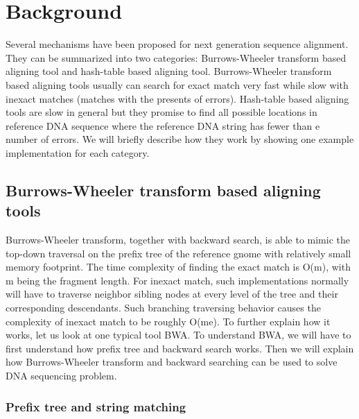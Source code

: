 \section{Background} \label{sec:background} 

Several mechanisms have been proposed for next generation sequence alignment.
They can be summarized into two categories: Burrows-Wheeler transform based
aligning tool and hash-table based aligning tool. Burrows-Wheeler transform
based aligning tools usually can search for exact match very fast while slow
with inexact matches (matches with the presents of errors). Hash-table based
aligning tools are slow in general but they promise to find all possible
locations in reference DNA sequence where the reference DNA string has fewer
than e number of errors. We will briefly describe how they work by showing one
example implementation for each category. \\

\subsection{Burrows-Wheeler transform based aligning tools} 

Burrows-Wheeler transform, together with backward search, is able to mimic the
top-down traversal on the prefix tree of the reference gnome with relatively
small memory footprint. The time complexity of finding the exact match is O(m),
with m being the fragment length. For inexact match, such implementations
normally will have to traverse neighbor sibling nodes at every level of the
tree and their corresponding descendants. Such branching traversing behavior
causes the complexity of inexact match to be roughly O(me). To further explain
how it works, let us look at one typical tool BWA.  To understand BWA, we will
have to first understand how prefix tree and backward search works. Then we
will explain how Burrows-Wheeler transform and backward searching can be used
to solve DNA sequencing problem.  

\subsubsection{Prefix tree and string matching} 

